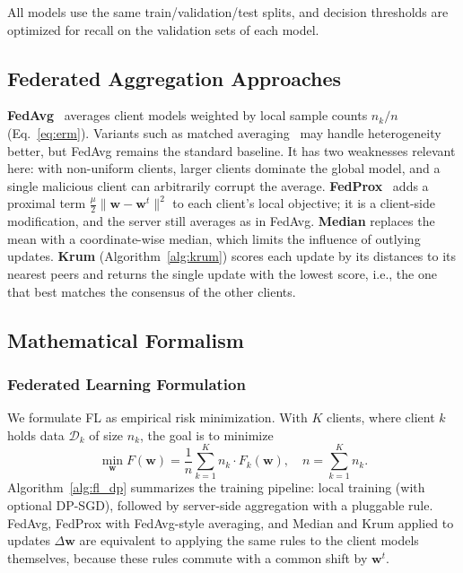 \documentclass[journal]{IEEEtran}
\begin{document}
All models use the same train/validation/test splits, and decision thresholds are optimized for recall on the validation sets of each model.

\subsection{Federated Aggregation Approaches}

\textbf{FedAvg}~\cite{mcmahan2017communication} averages client models weighted by local sample counts $n_k/n$ (Eq.~\eqref{eq:erm}). Variants such as matched averaging~\cite{wang2020federated} may handle heterogeneity better, but FedAvg remains the standard baseline. It has two weaknesses relevant here: with non-uniform clients, larger clients dominate the global model, and a single malicious client can arbitrarily corrupt the average. \textbf{FedProx}~\cite{fedprox} adds a proximal term $\frac{\mu}{2}\|\mathbf{w}-\mathbf{w}^t\|^2$ to each client's local objective; it is a client-side modification, and the server still averages as in FedAvg. \textbf{Median} replaces the mean with a coordinate-wise median, which limits the influence of outlying updates. \textbf{Krum} (Algorithm~\ref{alg:krum}) scores each update by its distances to its nearest peers and returns the single update with the lowest score, i.e., the one that best matches the consensus of the other clients.

\subsection{Mathematical Formalism}

\subsubsection{Federated Learning Formulation}

We formulate FL as empirical risk minimization. With $K$ clients, where client $k$ holds data $\mathcal{D}_k$ of size $n_k$, the goal is to minimize
\begin{equation}
\min_{\mathbf{w}} F(\mathbf{w}) = \frac{1}{n} \sum_{k=1}^{K} n_k \cdot F_k(\mathbf{w}), \quad n = \sum_{k=1}^{K} n_k.
\label{eq:erm}
\end{equation}
Algorithm~\ref{alg:fl_dp} summarizes the training pipeline: local training (with optional DP-SGD), followed by server-side aggregation with a pluggable rule. FedAvg, FedProx with FedAvg-style averaging, and Median and Krum applied to updates $\Delta\mathbf{w}$ are equivalent to applying the same rules to the client models themselves, because these rules commute with a common shift by $\mathbf{w}^t$.
\end{document}
